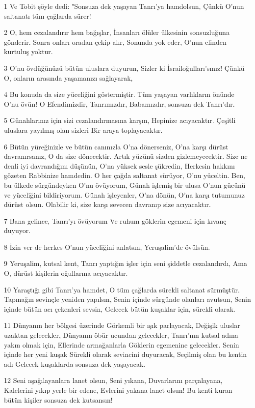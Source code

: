\par 1 Ve Tobit şöyle dedi: "Sonsuza dek yaşayan Tanrı'ya hamdolsun, Çünkü O'nun saltanatı tüm çağlarda sürer!
\par 2 O, hem cezalandırır hem bağışlar, İnsanları ölüler ülkesinin sonsuzluğuna gönderir. Sonra onları oradan çekip alır, Sonunda yok eder, O'nun elinden kurtuluş yoktur.
\par 3 O'nu övdüğünüzü bütün uluslara duyurun, Sizler ki İsrailoğulları'sınız! Çünkü O, onların arasında yaşamanızı sağlayarak,
\par 4 Bu konuda da size yüceliğini göstermiştir. Tüm yaşayan varlıkların önünde O'nu övün! O Efendimizdir, Tanrımızdır, Babamızdır, sonsuza dek Tanrı'dır.
\par 5 Günahlarınız için sizi cezalandırmasına karşın, Hepinize acıyacaktır. Çeşitli uluslara yayılmış olan sizleri Bir araya toplayacaktır.
\par 6 Bütün yüreğinizle ve bütün canınızla O'na dönerseniz, O'na karşı dürüst davranırsanız, O da size dönecektir. Artık yüzünü sizden gizlemeyecektir. Size ne denli iyi davrandığını düşünün, O'na yüksek sesle şükredin, Herkesin hakkını gözeten Rabbinize hamdedin. O her çağda saltanat sürüyor, O'nu yüceltin. Ben, bu ülkede sürgündeyken O'nu övüyorum, Günah işlemiş bir ulusa O'nun gücünü ve yüceliğini bildiriyorum. Günah işleyenler, O'na dönün, O'na karşı tutumunuz dürüst olsun. Olabilir ki, size karşı sevecen davranıp size acıyacaktır.
\par 7 Bana gelince, Tanrı'yı övüyorum Ve ruhum göklerin egemeni için kıvanç duyuyor.
\par 8 İzin ver de herkes O'nun yüceliğini anlatsın, Yeruşalim'de övülsün.
\par 9 Yeruşalim, kutsal kent, Tanrı yaptığın işler için seni şiddetle cezalandırdı, Ama O, dürüst kişilerin oğullarına acıyacaktır.
\par 10 Yaraştığı gibi Tanrı'ya hamdet, O tüm çağlarda sürekli saltanat sürmüştür. Tapınağın sevinçle yeniden yapılsın, Senin içinde sürgünde olanları avutsun, Senin içinde bütün acı çekenleri sevsin, Gelecek bütün kuşaklar için, sürekli olarak.
\par 11 Dünyanın her bölgesi üzerinde Görkemli bir ışık parlayacak, Değişik uluslar uzaktan gelecekler, Dünyanın öbür ucundan gelecekler, Tanrı'nın kutsal adına yakın olmak için, Ellerinde armağanlarla Göklerin egemenine gelecekler. Senin içinde her yeni kuşak Sürekli olarak sevincini duyuracak, Seçilmiş olan bu kentin adı Gelecek kuşaklarda sonsuza dek yaşayacak.
\par 12 Seni aşağılayanlara lanet olsun, Seni yıkana, Duvarlarını parçalayana, Kalelerini yıkıp yerle bir edene, Evlerini yakana lanet olsun! Bu kenti kuran bütün kişiler sonsuza dek kutsansın!
